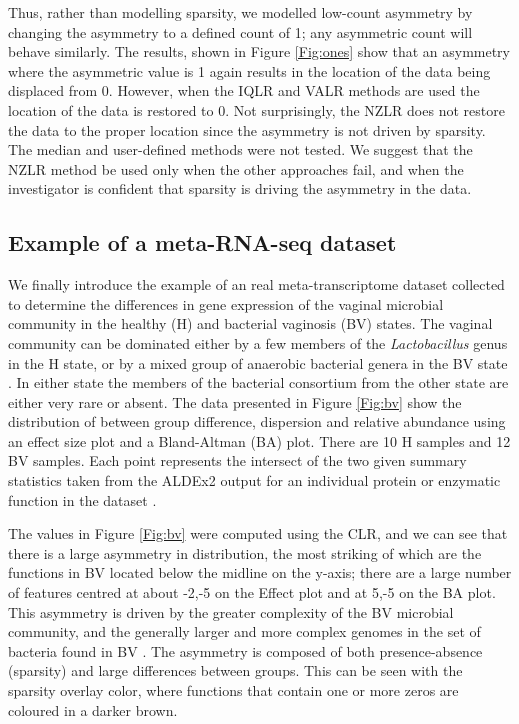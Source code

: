 \documentclass{bmcart}
\begin{document}
Thus, rather than modelling sparsity, we modelled low-count asymmetry by changing the asymmetry to a defined count of 1; any asymmetric count will behave similarly. The results, shown in Figure \ref{Fig:ones} show that an asymmetry where the asymmetric value is 1 again results in the location of the data being displaced from 0. However, when the IQLR and VALR methods are used the location of the data is restored to 0. Not surprisingly, the NZLR does not restore the data to the proper location since the asymmetry is not driven by sparsity. The median and user-defined methods were not tested. We suggest that the NZLR method be used only when the other approaches fail, and when the investigator is confident that sparsity is driving the asymmetry in the data. 


\subsection*{Example of a meta-RNA-seq dataset}
 We finally introduce the example of an real meta-transcriptome dataset collected to determine the differences in gene expression of the vaginal microbial community in the healthy (H) and bacterial vaginosis (BV) states. The vaginal community can be dominated either by a few members of the \textit{Lactobacillus} genus in the H state, or by a mixed group of anaerobic bacterial genera in the BV state \cite{Ravel:2010}. In either state the members of the bacterial consortium from the other state are either very rare or absent. The data presented in Figure \ref{Fig:bv} show the distribution of between group difference, dispersion and relative abundance using an effect size plot  and a Bland-Altman (BA) plot. There are 10 H samples and 12 BV samples. Each point represents the intersect of the two given summary statistics taken from the ALDEx2 output for an individual protein or enzymatic function in the dataset \cite{macklaim:2013}. 
 
The values in Figure \ref{Fig:bv} were computed using the CLR, and we can see that there is a large asymmetry in distribution, the most striking of which are the functions in BV located below the midline on the y-axis; there are a large number of features centred at about -2,-5 on the Effect plot and at 5,-5 on the BA plot. This asymmetry is driven by the greater complexity of the BV microbial community, and the generally larger and more complex genomes in the set of bacteria found in BV \cite{macklaim:2013}. The asymmetry is composed of both presence-absence (sparsity) and large differences between groups. This can be seen with the sparsity overlay color, where functions that contain one or more zeros are coloured in a darker brown. 
\end{document}
